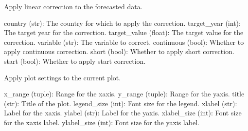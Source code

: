 \documentclass[letterpaper,10pt,english]{sphinxmanual}
\begin{document}
\begin{fulllineitems}
\begin{fulllineitems}
\label{\detokenize{Mainwindow:Mainwindow.MainWindow.apply_linear_correction}}
\pysigstartsignatures
{}
\pysigstopsignatures
\sphinxAtStartPar
Apply linear correction to the forecasted data.
\begin{description}
\sphinxAtStartPar
country (str): The country for which to apply the correction.
target\_year (int): The target year for the correction.
target\_value (float): The target value for the correction.
variable (str): The variable to correct.
continuous (bool): Whether to apply continuous correction.
short (bool): Whether to apply short correction.
start (bool): Whether to apply start correction.

\end{description}

\end{fulllineitems}


\begin{fulllineitems}
\label{\detokenize{Mainwindow:Mainwindow.MainWindow.apply_plot_settings}}
\pysigstartsignatures
{}
\pysigstopsignatures
\sphinxAtStartPar
Apply plot settings to the current plot.
\begin{description}
\sphinxAtStartPar
x\_range (tuple): Range for the x\sphinxhyphen{}axis.
y\_range (tuple): Range for the y\sphinxhyphen{}axis.
title (str): Title of the plot.
legend\_size (int): Font size for the legend.
xlabel (str): Label for the x\sphinxhyphen{}axis.
ylabel (str): Label for the y\sphinxhyphen{}axis.
xlabel\_size (int): Font size for the x\sphinxhyphen{}axis label.
ylabel\_size (int): Font size for the y\sphinxhyphen{}axis label.


\end{description}
\end{fulllineitems}
\end{fulllineitems}
\end{document}
